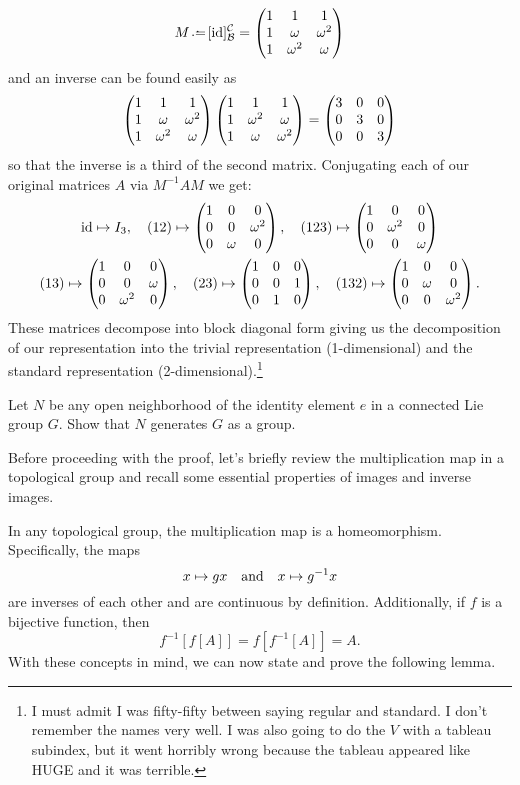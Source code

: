 \documentclass[12pt]{memoir}
\begin{document}
\begin{ptcbr}
    $$M\defeq [\id]_{\cB}^{\cC}=\threebythree{1}{1}{1}{1}{\om}{\om^2}{1}{\om^2}{\om}$$
    and an inverse can be found easily as 
    $$\begin{pmatrix} 1 & 1 & 1 \\ 1 & \omega & \omega^2 \\ 1 & \omega^2 & \omega \end{pmatrix}\begin{pmatrix} 1 & 1 & 1 \\ 1 & \omega^2 & \omega \\ 1 & \omega & \omega^2 \end{pmatrix}=\begin{pmatrix} 3 & 0 & 0 \\ 0 & 3 & 0 \\ 0 & 0 & 3 \end{pmatrix}$$
    so that the inverse is a third of the second matrix. Conjugating each of our original matrices $A$ via $M^{-1}AM$ we get:
    \begin{gather*}
        \operatorname{id}\mapsto I_3,\quad (12)\mapsto\begin{pmatrix} 1 & 0 & 0 \\ 0 & 0 & \omega^2 \\ 0 & \omega & 0 \end{pmatrix},\quad (123)\mapsto\begin{pmatrix} 1 & 0 & 0 \\ 0 & \omega^2 & 0 \\ 0 & 0 & \omega \end{pmatrix}\\
        (13)\mapsto\begin{pmatrix} 1 & 0 & 0 \\ 0 & 0 & \omega \\ 0 & \omega^2 & 0 \end{pmatrix},\quad (23)\mapsto\begin{pmatrix} 1 & 0 & 0 \\ 0 & 0 & 1 \\ 0 & 1 & 0 \end{pmatrix},\quad(132)\mapsto\begin{pmatrix} 1 & 0 & 0 \\ 0 & \omega & 0 \\ 0 & 0 & \omega^2 \end{pmatrix}.
    \end{gather*}
    These matrices decompose into block diagonal form giving us the decomposition of our representation into the trivial representation (1-dimensional) and the standard representation (2-dimensional).\footnote{I must admit I was fifty-fifty between saying regular and standard. I don't remember the names very well. I was also going to do the $V$ with a tableau subindex, but it went horribly wrong because the tableau appeared like HUGE and it was terrible.}
\end{ptcbr}
\begin{Ej}
    Let $N$ be any open neighborhood of the identity element $e$ in a connected Lie group $G$.
Show that $N$ generates $G$ as a group.
\end{Ej}



Before proceeding with the proof, let's briefly review the multiplication map in a topological group and recall some essential properties of images and inverse images.

\begin{Rmk}
In any topological group, the multiplication map is a homeomorphism. Specifically, the maps 
$$x \mapsto gx \quad\text{and}\quad x \mapsto g^{-1}x$$
are inverses of each other and are continuous by definition. Additionally, if $f$ is a bijective function, then 
$$f^{-1}[f[A]] = f[f^{-1}[A]] = A.$$
With these concepts in mind, we can now state and prove the following lemma.
\end{Rmk}
\end{document}
